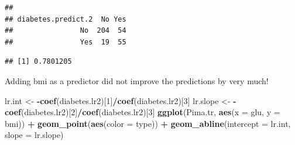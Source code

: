 \documentclass[]{article}
\newenvironment{Shaded}{\begin{snugshade}}{\end{snugshade}}
\newcommand{\KeywordTok}[1]{\textcolor[rgb]{0.13,0.29,0.53}{\textbf{#1}}}
\newcommand{\DataTypeTok}[1]{\textcolor[rgb]{0.13,0.29,0.53}{#1}}
\newcommand{\DecValTok}[1]{\textcolor[rgb]{0.00,0.00,0.81}{#1}}
\newcommand{\StringTok}[1]{\textcolor[rgb]{0.31,0.60,0.02}{#1}}
\newcommand{\OperatorTok}[1]{\textcolor[rgb]{0.81,0.36,0.00}{\textbf{#1}}}
\newcommand{\NormalTok}[1]{#1}
\begin{document}
\begin{Shaded}
\end{Shaded}

\begin{verbatim}
##                   
## diabetes.predict.2  No Yes
##                No  204  54
##                Yes  19  55
\end{verbatim}

\begin{Shaded}
\end{Shaded}

\begin{verbatim}
## [1] 0.7801205
\end{verbatim}

Adding bmi as a predictor did not improve the predictions by very much!

\begin{Shaded}
\begin{Highlighting}[]
\NormalTok{lr.int <-}\StringTok{ }\OperatorTok{-}\KeywordTok{coef}\NormalTok{(diabetes.lr2)[}\DecValTok{1}\NormalTok{]}\OperatorTok{/}\KeywordTok{coef}\NormalTok{(diabetes.lr2)[}\DecValTok{3}\NormalTok{]}
\NormalTok{lr.slope <-}\StringTok{ }\OperatorTok{-}\KeywordTok{coef}\NormalTok{(diabetes.lr2)[}\DecValTok{2}\NormalTok{]}\OperatorTok{/}\KeywordTok{coef}\NormalTok{(diabetes.lr2)[}\DecValTok{3}\NormalTok{]}
\KeywordTok{ggplot}\NormalTok{(Pima.tr, }\KeywordTok{aes}\NormalTok{(}\DataTypeTok{x =}\NormalTok{ glu, }\DataTypeTok{y =}\NormalTok{ bmi)) }\OperatorTok{+}\StringTok{ }\KeywordTok{geom_point}\NormalTok{(}\KeywordTok{aes}\NormalTok{(}\DataTypeTok{color =}\NormalTok{ type)) }\OperatorTok{+}
\StringTok{    }\KeywordTok{geom_abline}\NormalTok{(}\DataTypeTok{intercept =}\NormalTok{ lr.int, }\DataTypeTok{slope =}\NormalTok{ lr.slope)}
\end{Highlighting}
\end{Shaded}
\end{document}
